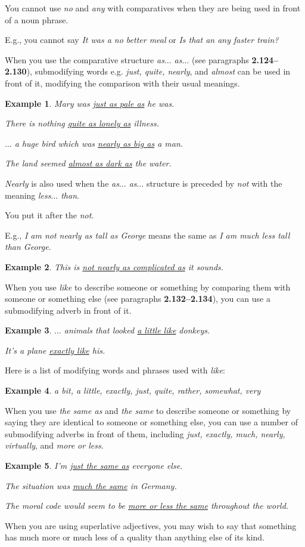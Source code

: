 \documentclass[oneside]{book}
\numberwithin{equation}{section}
\newtheorem{example}{Example}[section]
\begin{document}
You cannot use \textit{no} and \textit{any} with comparatives when they are being used in front of a noun phrase.

E.g., you cannot say \textit{It was a no better meal} or \textit{Is that an any faster train?}

%
\noindent{} When you use the comparative structure \textit{as$\ldots$ as$\ldots$} (see paragraphs \textbf{2.124--2.130}), submodifying words e.g. \textit{just, quite, nearly}, and \textit{almost} can be used in front of it, modifying the comparison with their usual meanings.
\begin{example}
    Mary was \underline{just as pale as} he was.
    
    There is nothing \underline{quite as lonely as} illness.
    
    $\ldots$ a huge bird which was \underline{nearly as big as} a man.
    
    The land seemed \underline{almost as dark as} the water.
\end{example}
\textit{Nearly} is also used when the \textit{as$\ldots$ as$\ldots$} structure is preceded by \textit{not} with the meaning \textit{less$\ldots$ than}.

You put it after the \textit{not}.

E.g., \textit{I am not nearly as tall as George} means the same as \textit{I am much less tall than George}.
\begin{example}
    This is \underline{not nearly as complicated as} it sounds.
\end{example}
%
\noindent{} When you use \textit{like} to describe someone or something by comparing them with someone or something else (see paragraphs \textbf{2.132--2.134}), you can use a submodifying adverb in front of it.
\begin{example}
    $\ldots$ animals that looked \underline{a little like} donkeys.
    
    It's a plane \underline{exactly like} his.
\end{example}
Here is a list of modifying words and phrases used with \textit{like}:
\begin{example}
    a bit, a little, exactly, just, quite, rather, somewhat, very
\end{example}
%
\noindent{} When you use \textit{the same as} and \textit{the same} to describe someone or something by saying they are identical to someone or something else, you can use a number of submodifying adverbs in front of them, including \textit{just, exactly, much, nearly, virtually}, and \textit{more or less}.
\begin{example}
    I'm \underline{just the same as} everyone else.
    
    The situation was \underline{much the same} in Germany.
    
    The moral code would seem to be \underline{more or less the same} throughout the world.
\end{example}
%
\noindent{} When you are using superlative adjectives, you may wish to say that something has much more or much less of a quality than anything else of its kind.
\end{document}
